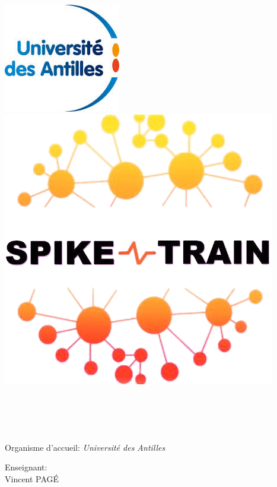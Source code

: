 \begin{titlepage}
	\begin{center}
		\includegraphics[scale=1.80]{./images/iconUA.png}
		\hspace{2cm}
		\includegraphics[scale=0.25]{./images/iconSpike.png} \\[2cm]
		\hspace{2.5cm}

		\HRule \\[0.4cm]
		\@title \\[0.4cm]
		\HRule \\[1cm]

		\@author \\ [1.5cm]

		{\large Organisme d'accueil: \textsl{Université des Antilles}} \\[1.5cm]

		\begin{minipage}{0.7\textwidth}
			\begin{center}
				Enseignant: \\
				\hspace{0.2cm} Vincent \textsc{PAG\'E}
			\end{center}
		\end{minipage}\\[3cm]

		\@date
	\end{center}
\end{titlepage}
